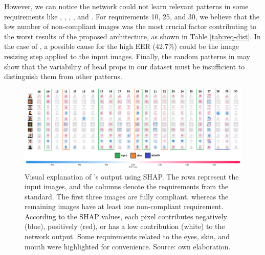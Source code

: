 However, we can notice the network could not learn relevant patterns in some requirements like \inkmarked, \pixelation, \framestooheavy, \hatcap, and \otherfacesortoys. For requirements 10, 25, and 30, we believe that the low number of non-compliant images was the most crucial factor contributing to the worst results of the proposed architecture, as shown in Table \ref{tab:req-dist}. In the case of \pixelation, a possible cause for the high EER (42.7\%) could be the image resizing step applied to the input images. Finally, the random patterns in \hatcap may show that the variability of head props in our dataset must be insufficient to distinguish them from other patterns. 
 
\begin{landscape}
\begin{figure}[tb]
\centering
\includegraphics[width=\linewidth]{images/network_viz/shap.png}
\caption{Visual explanation of \methodname's output using SHAP. The rows represent the input images, and the columns denote the requirements from the \icao standard. The first three images are fully compliant, whereas the remaining images have at least one non-compliant requirement. According to the SHAP values, each pixel contributes negatively (blue), positively (red), or has a low contribution (white) to the network output. Some requirements related to the eyes, skin, and mouth were highlighted for convenience. Source: own elaboration.}
\label{fig:shap}
\end{figure}
\end{landscape}
 